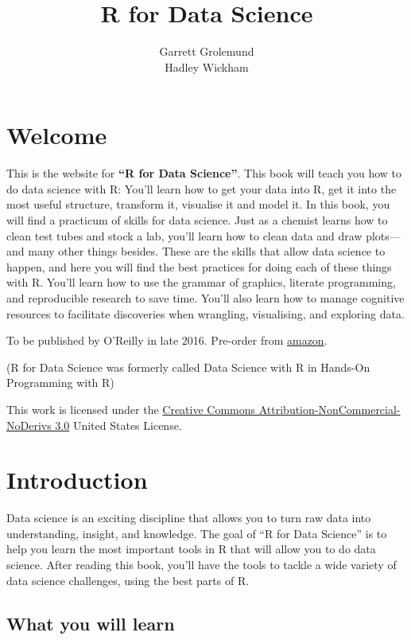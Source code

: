 \documentclass[]{book}
\title{R for Data Science}
\author{Garrett Grolemund \\ Hadley Wickham}
\date{}
\begin{document}
\maketitle

{
\setcounter{tocdepth}{1}
\tableofcontents
}
\chapter*{Welcome}\label{welcome}

This is the website for \textbf{``R for Data Science''}. This book will
teach you how to do data science with R: You'll learn how to get your
data into R, get it into the most useful structure, transform it,
visualise it and model it. In this book, you will find a practicum of
skills for data science. Just as a chemist learns how to clean test
tubes and stock a lab, you'll learn how to clean data and draw
plots---and many other things besides. These are the skills that allow
data science to happen, and here you will find the best practices for
doing each of these things with R. You'll learn how to use the grammar
of graphics, literate programming, and reproducible research to save
time. You'll also learn how to manage cognitive resources to facilitate
discoveries when wrangling, visualising, and exploring data.

To be published by O'Reilly in late 2016. Pre-order from
\href{http://amzn.to/2aHLAQ1}{amazon}.

(R for Data Science was formerly called Data Science with R in Hands-On
Programming with R)

This work is licensed under the
\href{http://creativecommons.org/licenses/by-nc-nd/3.0/us/}{Creative
Commons Attribution-NonCommercial-NoDerivs 3.0} United States License.

\chapter{Introduction}\label{introduction}

Data science is an exciting discipline that allows you to turn raw data
into understanding, insight, and knowledge. The goal of ``R for Data
Science'' is to help you learn the most important tools in R that will
allow you to do data science. After reading this book, you'll have the
tools to tackle a wide variety of data science challenges, using the
best parts of R.

\section{What you will learn}\label{what-you-will-learn}
\end{document}
